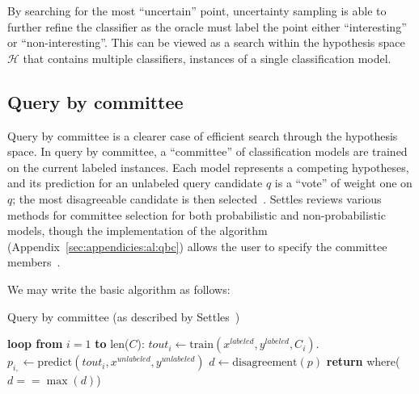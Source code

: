 \noindent By searching for the most ``uncertain'' point, uncertainty sampling 
is able to further refine the classifier as the oracle must label the point 
either ``interesting'' or ``non-interesting''. This can be viewed as a search 
within the hypothesis space $\mathcal{H}$ that contains multiple classifiers, 
instances of a single classification model.





\subsection{Query by committee}
\label{sec:al:methods:qbc}

Query by committee is a clearer case of efficient search through the hypothesis 
space. In query by committee, a ``committee'' of classification models are 
trained on the  current labeled instances.  Each model represents a competing 
hypotheses, and its prediction for an unlabeled query candidate $q$ is a 
``vote'' of weight one on $q$; the most disagreeable candidate is then 
selected~\cite{settles2010}. Settles reviews various methods for committee 
selection for both probabilistic and non-probabilistic models, though the 
implementation of the algorithm (Appendix~\ref{sec:appendicies:al:qbc}) allows 
the user to specify the committee members~\cite{settles2010}. 

We may write the basic algorithm as follows:

\tablespacing
\begin{algorithm}[H]
	\caption{Query by committee (as described by 
	Settles~\cite{settles2010})}\label{euclid}
	\begin{algorithmic}[1]
		\State \textbf{loop from} $i=1$ \textbf{to} len($C$):
		\State \indent $\textit{tout}_{i} \gets 
		\text{train}(x^{labeled},y^{labeled},C_i)$.
		\State \indent $p_{i,} \gets 
		\text{predict}(\textit{tout}_i,x^{unlabeled},y^{unlabeled})$
		\State $d \gets \text{disagreement}(p)$
		\State \textbf{return} where($d==\max{(d)}$)
		\EndProcedure
	\end{algorithmic}
\end{algorithm}
\bodyspacing

